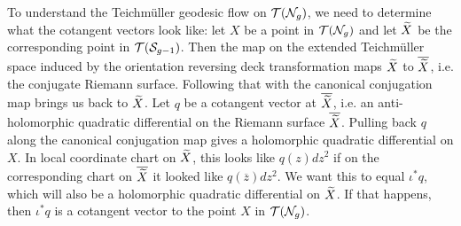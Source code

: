 \documentclass[12pt, reqno]{amsart}
\begin{document}
To understand the Teichm\"uller geodesic flow on $\mathcal{T}(\mathcal{N}_g)$, we need to determine what the cotangent vectors look like: let $X$ be a point in $\mathcal{T}(\mathcal{N}_{g})$ and let $\widetilde{X}$ be the corresponding point in $\mathcal{T}(\mathcal{S}_{g-1})$.
Then the map on the extended Teichmüller space induced by the orientation reversing deck transformation maps $\widetilde{X}$ to $\overline{\widetilde{X}}$, i.e. the conjugate Riemann surface. Following that with the canonical conjugation map brings us back to $\widetilde{X}$.
Let $q$ be a cotangent vector at $\overline{\widetilde{X}}$, i.e. an anti-holomorphic quadratic differential on the Riemann surface $\overline{\widetilde{X}}$.
Pulling back $q$ along the canonical conjugation map gives a holomorphic quadratic differential on $X$.
In local coordinate chart on $\widetilde{X}$, this looks like $q(z) dz^2$ if on the corresponding chart on $\overline{\widetilde{X}}$ it looked like $q(\overline{z}) dz^2$.
We want this to equal $\iota^{\ast}q$, which will also be a holomorphic quadratic differential on $\widetilde{X}$.
If that happens, then $\iota^{\ast} q$ is a cotangent vector to the point $X$ in $\mathcal{T}(\mathcal{N}_g)$.
\end{document}
